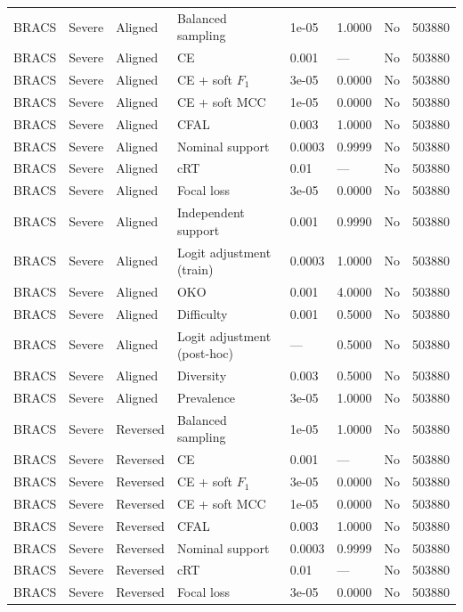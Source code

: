 \begin{longtable}{lllllllr}
BRACS & Severe & Aligned & Balanced sampling & 1e-05 & 1.0000 & No & 503880 \\
BRACS & Severe & Aligned & CE & 0.001 & --- & No & 503880 \\
BRACS & Severe & Aligned & CE + soft $F_1$ & 3e-05 & 0.0000 & No & 503880 \\
BRACS & Severe & Aligned & CE + soft MCC & 1e-05 & 0.0000 & No & 503880 \\
BRACS & Severe & Aligned & CFAL & 0.003 & 1.0000 & No & 503880 \\
BRACS & Severe & Aligned & Nominal support & 0.0003 & 0.9999 & No & 503880 \\
BRACS & Severe & Aligned & cRT & 0.01 & --- & No & 503880 \\
BRACS & Severe & Aligned & Focal loss & 3e-05 & 0.0000 & No & 503880 \\
BRACS & Severe & Aligned & Independent support & 0.001 & 0.9990 & No & 503880 \\
BRACS & Severe & Aligned & Logit adjustment (train) & 0.0003 & 1.0000 & No & 503880 \\
BRACS & Severe & Aligned & OKO & 0.001 & 4.0000 & No & 503880 \\
BRACS & Severe & Aligned & Difficulty & 0.001 & 0.5000 & No & 503880 \\
BRACS & Severe & Aligned & Logit adjustment (post-hoc) & --- & 0.5000 & No & 503880 \\
BRACS & Severe & Aligned & Diversity & 0.003 & 0.5000 & No & 503880 \\
BRACS & Severe & Aligned & Prevalence & 3e-05 & 1.0000 & No & 503880 \\
BRACS & Severe & Reversed & Balanced sampling & 1e-05 & 1.0000 & No & 503880 \\
BRACS & Severe & Reversed & CE & 0.001 & --- & No & 503880 \\
BRACS & Severe & Reversed & CE + soft $F_1$ & 3e-05 & 0.0000 & No & 503880 \\
BRACS & Severe & Reversed & CE + soft MCC & 1e-05 & 0.0000 & No & 503880 \\
BRACS & Severe & Reversed & CFAL & 0.003 & 1.0000 & No & 503880 \\
BRACS & Severe & Reversed & Nominal support & 0.0003 & 0.9999 & No & 503880 \\
BRACS & Severe & Reversed & cRT & 0.01 & --- & No & 503880 \\
BRACS & Severe & Reversed & Focal loss & 3e-05 & 0.0000 & No & 503880 \\

\end{longtable}
